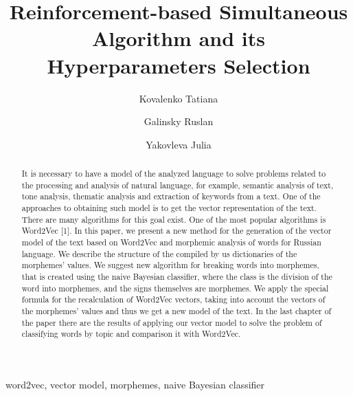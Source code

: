 \documentclass{svproc}
\begin{document}
\mainmatter              %
\title{Reinforcement-based Simultaneous Algorithm and its
Hyperparameters Selection}
%
%
\author{Kovalenko Tatiana\and Galinsky Ruslan \and Yakovleva Julia}
%
%
%
%

\maketitle

\begin{abstract}
It is necessary to have a model of the analyzed language to solve problems related to the processing and analysis of natural language, for example, semantic analysis of text, tone analysis, thematic analysis and extraction of keywords from a text. One of the approaches to obtaining such model is to get the vector representation of the text. There are many algorithms for this goal exist. One of the most popular algorithms is Word2Vec [1]. In this paper, we present a new method for the generation of the vector model of the text based on Word2Vec and morphemic analysis of words for Russian language. We describe the structure of the compiled by us dictionaries of the morphemes' values. We suggest new algorithm for breaking words into morphemes, that is created using the naive Bayesian classifier, where the class is the division of the word into morphemes, and the signs themselves are morphemes. We apply the special formula for the recalculation of Word2Vec vectors, taking into account the vectors of the morphemes' values and thus we get a new model of the text. In the last chapter of the paper there are the results of applying our vector model to solve the problem of classifying words by topic and сomparison it with Word2Vec.
\end{abstract}
\begin{keywords}
word2vec, vector model, morphemes, naive Bayesian classifier
\end{keywords}
\end{document}
